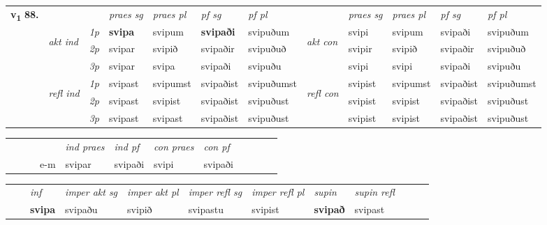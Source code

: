 \begin{tabular}{llllllllllll} \toprule
\multirow{4}{*}{{{\textbf{v{\textsubscript{1}}} \Large{\textbf{88.}}}}}  & &   &  \textit{praes sg}  & \textit{praes pl}  &\textit{ pf sg} & \textit{pf pl} &  &  \textit{praes sg}  & \textit{praes pl}  & \textit{pf sg} & \textit{pf pl } \\*
	\cmidrule{4-7} \cmidrule{9-12}
 & \multirow{3}{*}{\begin{turn}{90}\textit{akt ind}\end{turn}} & {\textit{1p}} & \textbf{svipa} & svipum    & \textbf{svipaði} & svipuðum & \multirow{3}{*}{\begin{turn}{90}\textit{akt con}\end{turn}} &svipi & svipum & svipaði & svipuðum\\*
& &  {\textit{2p}} &  svipar  & svipið   & svipaðir & svipuðuð & & svipir & svipið & svipaðir & svipuðuð \\*
& &  {\textit{3p}} & svipar & svipa   & svipaði & svipuðu & & svipi & svipi& svipaði & svipuðu  \\*
\cmidrule{4-7} \cmidrule{9-12}
 &\multirow{3}{*}{\begin{turn}{90}\textit{refl ind}\end{turn}} & {\textit{1p}} & svipast & svipumst    & svipaðist & svipuðumst & \multirow{3}{*}{\begin{turn}{90}\textit{refl con}\end{turn}}  &svipist & svipumst & svipaðist & svipuðumst\\*
 &&  {\textit{2p}} &  svipast  & svipist   & svipaðist & svipuðust & &svipist & svipist & svipaðist & svipuðust \\*
& &  {\textit{3p}} & svipast & svipast   & svipaðist & svipuðust & & svipist & svipist& svipaðist & svipuðust  \\*
\cmidrule{4-7} \cmidrule{9-12}
\end{tabular}


\begin{tabular}{llllllllllll}
 & &  & &  \textit{ind praes} & \textit{ind pf} & \textit{con praes} & \textit{con pf} \\*
&  & & e-m & svipar & svipaði & svipi & svipaði \\*
\cmidrule{5-9}
\end{tabular}


\begin{tabular}{llllllllllll}
 & & \textit{inf} & \textit{imper akt sg} & \textit{imper akt pl} & \textit{imper refl sg} & \textit{imper refl pl}  & \textit{supin} & \textit{supin refl}      \\*
  & & \textbf{svipa} & svipaðu  & svipið & svipastu & svipist  &  \textbf{svipað} & svipast  \\*
\cmidrule{1-12}
\end{tabular}



